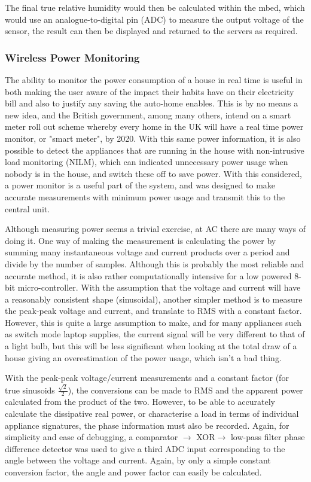 \documentclass[10.5pt,a4paper,twoside]{report}   %
\begin{document}
The final true relative humidity would then be calculated within the mbed, which would use an analogue-to-digital pin (ADC) to measure the output voltage of the sensor, the result can then be displayed and returned to the servers as required.


\subsubsection{Wireless Power Monitoring}


The ability to monitor the power consumption of a house in real time is useful in both making the user aware of the impact their habits have on their electricity bill and also to justify any saving the auto-home enables. This is by no means a new idea, and the British government, among many others, intend on a smart meter roll out scheme whereby every home in the UK will have a real time power monitor, or "smart meter", by 2020\cite{doecc}. With this same power information, it is also possible to detect the appliances that are running in the house with non-intrusive load monitoring\cite{hartgw} (NILM), which can indicated unnecessary power usage when nobody is in the house, and switch these off to save power. With this considered, a power monitor is a useful part of the system, and was designed to make accurate measurements with minimum power usage and transmit this to the central unit.

Although measuring power seems a trivial exercise, at AC there are many ways of doing it. One way of making the measurement is calculating the power by summing many instantaneous voltage and current products over a period and divide by the number of samples. Although this is probably the most reliable and accurate method, it is also rather computationally intensive for a low powered 8-bit micro-controller. With the assumption that the voltage and current will have a reasonably consistent shape (sinusoidal), another simpler method is to measure the peak-peak voltage and current, and translate to RMS with a constant factor. However, this is quite a large assumption to make, and for many appliances such as switch mode laptop supplies, the current signal will be very different to that of a light bulb, but this will be less significant when looking at the total draw of a house giving an overestimation of the power usage, which isn't a bad thing.

With the peak-peak voltage/current measurements and a constant factor (for true sinusoids $\frac{\sqrt{2}}{2}$), the conversions can be made to RMS and the apparent power calculated from the product of the two. However, to be able to accurately calculate the dissipative real power, or characterise a load in terms of individual appliance signatures, the phase information must also be recorded. Again, for simplicity and ease of debugging, a comparator $\rightarrow$ XOR$\rightarrow$ low-pass filter phase difference detector was used to give a third ADC input corresponding to the angle between the voltage and current. Again, by only a simple constant conversion factor, the angle and power factor can easily be calculated.   
\end{document}
